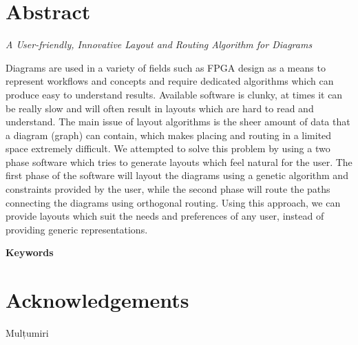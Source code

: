 \chapter*{Abstract}

\emph{A User-friendly, Innovative Layout and Routing Algorithm for Diagrams }

\vspace{\baselineskip}

Diagrams are used in a variety of fields such as FPGA design as a means to represent workflows and concepts and require dedicated algorithms which can produce easy to understand results. 
Available software is clunky, at times it can be really slow and will often result in layouts which are hard to read and understand. The main issue of layout algorithms is the sheer amount 
of data that a diagram (graph) can contain, which makes placing and routing in a limited space extremely difficult. We attempted to solve this problem by using a two phase software which tries 
to generate layouts which feel natural for the user. The first phase of the software will layout the diagrams using a genetic algorithm and constraints provided by the user, while the second 
phase will route the paths connecting the diagrams using orthogonal routing. Using this approach, we can provide layouts which suit the needs and preferences of any user, instead of providing 
generic representations.

\vspace{\baselineskip}
\textbf{Keywords} 

\chapter*{Acknowledgements}

Mulțumiri 

